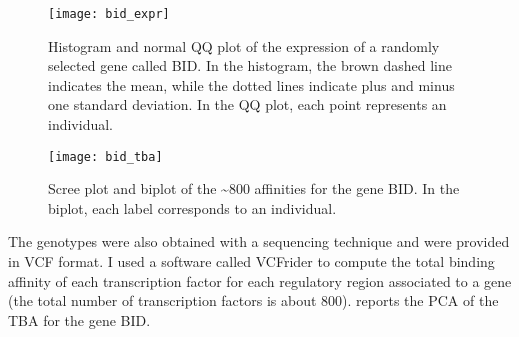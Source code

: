 \begin{figure}[b]
  \centering
  \texttt{[image: bid\_expr]}
  \caption{Histogram and normal QQ plot of the 
expression of a randomly selected gene called BID. In the histogram, the 
brown dashed line indicates the mean, while the dotted lines indicate 
plus and minus one standard deviation. In the QQ 
plot, each point represents an individual.}
\end{figure}

\begin{figure}[t]
  \centering
  \texttt{[image: bid\_tba]}
  \caption{Scree plot and biplot of the \textasciitilde800 affinities for the gene 
BID. In the biplot, each label corresponds to an individual.}
\end{figure}

The genotypes were also obtained with a sequencing technique and were 
provided in VCF format.  I 
used a software called 
\nohyphens{VCF\textunderscore\nobreak\hspace{0pt}rider} 
to compute the total binding affinity of each transcription factor for 
each regulatory region associated to a gene (the total number of 
transcription factors is about 800).  reports the PCA of 
the TBA for the gene BID.
